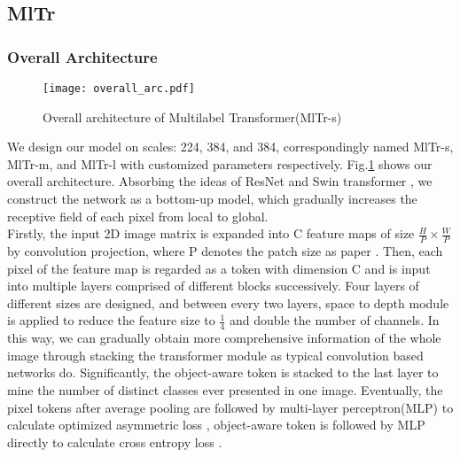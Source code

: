 \documentclass{article} \usepackage[numbers,sort&compress]{natbib}
\begin{document}
\subsection{MlTr}
\subsubsection{Overall Architecture}
\begin{figure}[h]
\begin{center}
\texttt{[image: overall\_arc.pdf]}
\caption{Overall architecture of Multilabel Transformer(MlTr-s)}
\label{figure2}
\end{center}
\end{figure}
We design our model on scales: 224, 384, and 384, correspondingly named MlTr-s, MlTr-m, and MlTr-l with customized parameters respectively. Fig.\ref{figure2} shows our overall architecture. Absorbing the ideas of ResNet \cite{he2016deep} and Swin transformer \cite{liu2021swin}, we construct the network as a bottom-up model, which gradually increases the receptive field of each pixel from local to global. \\
Firstly, the input 2D image matrix is expanded into C feature maps of size $\frac{H}{P}\times\frac{W}{P}$ by convolution projection, where P denotes the patch size as paper \cite{vaswani2017attention}. Then, each pixel of the feature map is regarded as a token with dimension C and is input into multiple layers comprised of different blocks successively. Four layers of different sizes are designed, and between every two layers, space to depth module \cite{heo2021rethinking} is applied to reduce the feature size to $\frac{1}{4}$ and double the number of channels. In this way, we can gradually obtain more comprehensive information of the whole image through stacking the transformer module as typical convolution based networks do. Significantly, 
the object-aware token is stacked to the last layer to mine the number of distinct classes ever presented in one image. Eventually, the pixel tokens after average pooling \cite{boureau2010theoretical} are followed by multi-layer perceptron(MLP) to calculate optimized asymmetric loss \cite{ben2020asymmetric}, object-aware token is followed by MLP directly to calculate cross entropy loss \cite{jang2016categorical,de2005tutorial}.
\end{document}
